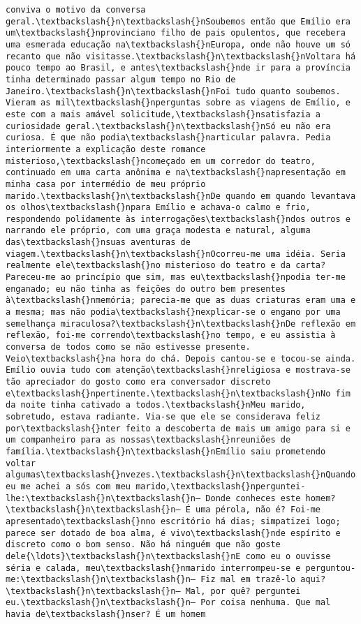 \begin{Verbatim}[commandchars=\\\{\}]
conviva o motivo da conversa geral.\textbackslash{}n\textbackslash{}nSoubemos então que Emílio era um\textbackslash{}nprovinciano filho de pais opulentos, que recebera uma esmerada educação na\textbackslash{}nEuropa, onde não houve um só recanto que não visitasse.\textbackslash{}n\textbackslash{}nVoltara há pouco tempo ao Brasil, e antes\textbackslash{}nde ir para a província tinha determinado passar algum tempo no Rio de Janeiro.\textbackslash{}n\textbackslash{}nFoi tudo quanto soubemos. Vieram as mil\textbackslash{}nperguntas sobre as viagens de Emílio, e este com a mais amável solicitude,\textbackslash{}nsatisfazia a curiosidade geral.\textbackslash{}n\textbackslash{}nSó eu não era curiosa. É que não podia\textbackslash{}narticular palavra. Pedia interiormente a explicação deste romance misterioso,\textbackslash{}ncomeçado em um corredor do teatro, continuado em uma carta anônima e na\textbackslash{}napresentação em minha casa por intermédio de meu próprio marido.\textbackslash{}n\textbackslash{}nDe quando em quando levantava os olhos\textbackslash{}npara Emílio e achava-o calmo e frio, respondendo polidamente às interrogações\textbackslash{}ndos outros e narrando ele próprio, com uma graça modesta e natural, alguma das\textbackslash{}nsuas aventuras de viagem.\textbackslash{}n\textbackslash{}nOcorreu-me uma idéia. Seria realmente ele\textbackslash{}no misterioso do teatro e da carta? Pareceu-me ao princípio que sim, mas eu\textbackslash{}npodia ter-me enganado; eu não tinha as feições do outro bem presentes à\textbackslash{}nmemória; parecia-me que as duas criaturas eram uma e a mesma; mas não podia\textbackslash{}nexplicar-se o engano por uma semelhança miraculosa?\textbackslash{}n\textbackslash{}nDe reflexão em reflexão, foi-me correndo\textbackslash{}no tempo, e eu assistia à conversa de todos como se não estivesse presente. Veio\textbackslash{}na hora do chá. Depois cantou-se e tocou-se ainda. Emílio ouvia tudo com atenção\textbackslash{}nreligiosa e mostrava-se tão apreciador do gosto como era conversador discreto e\textbackslash{}npertinente.\textbackslash{}n\textbackslash{}nNo fim da noite tinha cativado a todos.\textbackslash{}nMeu marido, sobretudo, estava radiante. Via-se que ele se considerava feliz por\textbackslash{}nter feito a descoberta de mais um amigo para si e um companheiro para as nossas\textbackslash{}nreuniões de família.\textbackslash{}n\textbackslash{}nEmílio saiu prometendo voltar algumas\textbackslash{}nvezes.\textbackslash{}n\textbackslash{}nQuando eu me achei a sós com meu marido,\textbackslash{}nperguntei-lhe:\textbackslash{}n\textbackslash{}n— Donde conheces este homem?\textbackslash{}n\textbackslash{}n— É uma pérola, não é? Foi-me apresentado\textbackslash{}nno escritório há dias; simpatizei logo; parece ser dotado de boa alma, é vivo\textbackslash{}nde espírito e discreto como o bom senso. Não há ninguém que não goste dele{\ldots}\textbackslash{}n\textbackslash{}nE como eu o ouvisse séria e calada, meu\textbackslash{}nmarido interrompeu-se e perguntou-me:\textbackslash{}n\textbackslash{}n— Fiz mal em trazê-lo aqui?\textbackslash{}n\textbackslash{}n— Mal, por quê? perguntei eu.\textbackslash{}n\textbackslash{}n— Por coisa nenhuma. Que mal havia de\textbackslash{}nser? É um homem 
\end{Verbatim}
